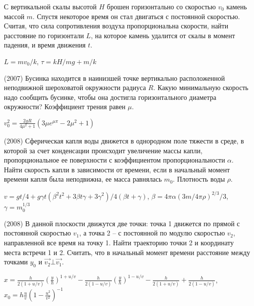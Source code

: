 \begin{ex}
С вертикальной скалы высотой $H$ брошен горизонтально со скоростью $v_0$ камень массой $m$. Спустя некоторое время он стал двигаться с постоянной скоростью. Считая, что сила сопротивления воздуха пропорциональна скорости, найти расстояние по горизонтали $L$, на которое камень удалится от скалы в момент падения, и время движения $t$.
\begin{ans}
$L = mv_0/k$, $\tau = kH/mg + m/k$
\end{ans}
\end{ex}

\begin{ex}
(2007) Бусинка находится в наинизшей точке вертикально расположенной неподвижной шероховатой окружности радиуса $R$. Какую минимальную скорость надо сообщить бусинке, чтобы она достигла горизонтального диаметра окружности? Коэффициент трения равен $\mu$.
\begin{ans}
$v_0^2 = \frac{2gR}{4\mu^2+1}\left( 3\mu e^{\mu \pi} - 2\mu^2 +1\right)$
\end{ans}
\end{ex}

\begin{ex}
(2008) Сферическая капля воды движется в однородном поле тяжести в среде, в которой за счет конденсации происходит увеличение массы капли, пропорциональное ее поверхности с коэффициентом пропорциональности $\alpha$. Найти скорость капли в зависимости от времени, если в начальный момент времени капля была неподвижна, ее масса равнялась $m_0$. Плотность воды $\rho$.
\begin{ans}
$v=gt/4+g\gamma t (\beta^2t^2+3\beta t \gamma+3\gamma^2)/4(\beta t + \gamma)$, $\beta = 4\pi \alpha(3m/4\pi\rho)^{2/3}/3$, $\gamma = m_0^{1/3}$
\end{ans}
\end{ex}

\begin{ex} (2008) В данной плоскости движутся две точки: точка 1 движется по прямой с постоянной скоростью $v_1$, а точка 2 – с постоянной по модулю скоростью $v_2$, направленной все время на точку 1. Найти траекторию точки 2 и координату места встречи 1 и 2. Считать, что в начальный момент времени расстояние между точками $y_0$ и $\vec{v_2} \bot \vec{v_1}$.
\begin{ans}
$x=\frac{h}{2(1+u/v)}(\frac{y}{h})^{1+u/v} - \frac{h}{2(1-u/v)}(\frac{y}{h})^{1-u/v} - \frac{h}{2(1+u/v)}+\frac{h}{2(1-u/v)}$, $x_0=h\frac{u}{v}\left(1-\frac{u^2}{v^2}\right)^{-1}$
\end{ans}
\end{ex}